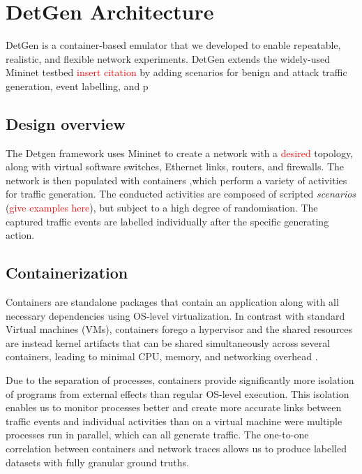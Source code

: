 \documentclass{article}
\begin{document}
\section{DetGen Architecture}

DetGen is a container-based emulator that we developed to enable repeatable, realistic, and flexible network experiments. DetGen extends the widely-used Mininet testbed \textcolor{red}{insert citation} by adding scenarios for benign and attack traffic generation, event labelling, and p


\subsection{Design overview}

The Detgen framework uses Mininet to create a network with a \textcolor{red}{desired} topology, along with virtual software switches, Ethernet links, routers, and firewalls. The network is then populated with containers ,which perform a variety of activities for traffic generation. The conducted activities are composed of scripted \textit{scenarios} (\textcolor{red}{give examples here}), but subject to a high degree of randomisation. The captured traffic events are labelled individually after the specific generating action. 

\subsection{Containerization}
Containers are standalone packages that contain an application along with all necessary dependencies using OS-level virtualization. In contrast with standard Virtual machines (VMs), containers forego a hypervisor and the shared resources are instead kernel artifacts that can be shared simultaneously across several containers, leading to minimal CPU, memory, and networking overhead \cite{kolyshkin2006virtualization}.



Due to the separation of processes, containers provide significantly more isolation of programs from external effects than regular OS-level execution. This isolation enables us to monitor processes better and create more accurate links between traffic events and individual activities than on a virtual machine were multiple processes run in parallel, which can all generate traffic. The one-to-one correlation between containers and network traces allows us to produce labelled datasets with fully granular ground truths. 
\end{document}
